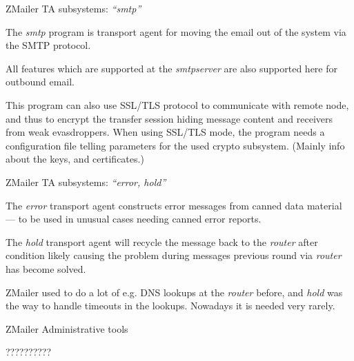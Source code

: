 \documentclass[a4paper,landscape]{slides}
\newcommand{\ZM}{ZMailer}
\begin{document}
\begin{slide}

\centerline{\large \ZM{} TA subsystems: {\em ``smtp''}}

The {\em smtp} program is transport agent for moving the email
out of the system via the SMTP protocol.

All features which are supported at the {\em smtpserver} are
also supported here for outbound email.

This program can also use SSL/TLS protocol to communicate with
remote node, and thus to encrypt the transfer session hiding
message content and receivers from weak evasdroppers.
When using SSL/TLS mode, the program needs a configuration file
telling parameters for the used crypto subsystem.
(Mainly info about the keys, and certificates.)

\vfill
\end{slide}



\begin{slide}

\centerline{\large \ZM{} TA subsystems: {\em ``error, hold''}}

The {\em error} transport agent constructs error messages from
canned data material --- to be used in unusual cases needing
canned error reports.

The {\em hold} transport agent will recycle the message back to
the {\em router} after condition likely causing the problem
during messages previous round via {\em router} has become solved.

\ZM{} used to do a lot of e.g. DNS lookups at the {\em router} before,
and {\em hold} was the way to handle timeouts in the lookups.
Nowadays it is needed very rarely.

\vfill
\end{slide}



\begin{slide}
\centerline{\large \ZM{} Administrative tools}

{\Huge ??????????}

\vfill
\end{slide}

\end{document}
